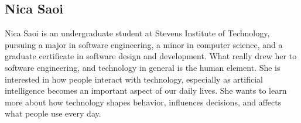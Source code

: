 \subsection{Nica Saoi}
Nica Saoi is an undergraduate student at Stevens Institute of Technology, pursuing a major in software engineering, a minor in computer science, and a graduate certificate in software design and development. What really drew her to software engineering, and technology in general is the human element. She is interested in how people interact with technology, especially as artificial intelligence becomes an important aspect of our daily lives. She wants to learn more about how technology shapes behavior, influences decisions, and affects what people use every day.







